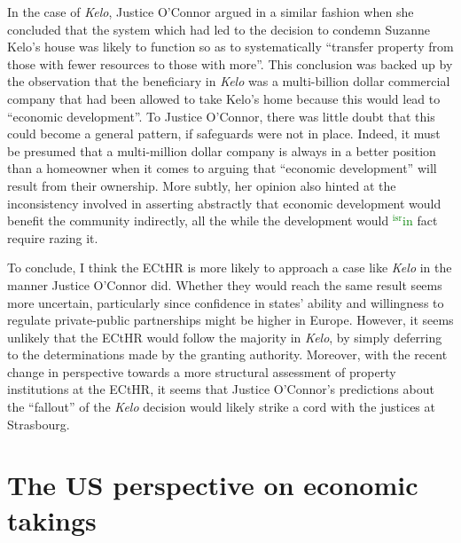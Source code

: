 \documentclass[12pt,a4paper]{book} %
\newcommand{\isr}[1]{\textcolor{green}{$^{\textrm{isr}}${#1}}}
\begin{document}
In the case of {\it Kelo}, Justice O'Connor argued in  a similar fashion when she concluded that the system which had led to the decision to condemn Suzanne Kelo's house was likely to function so as to systematically ``transfer property from those with fewer resources to those with more''. This conclusion was backed up by the observation that the beneficiary in {\it Kelo} was a multi-billion dollar commercial company that had been allowed to take Kelo's home because this would lead to ``economic development''. To Justice O'Connor, there was little doubt that this could become a general pattern, if safeguards were not in place. Indeed, it must be presumed that a multi-million dollar company is always in a better position than a homeowner when it comes to arguing that  ``economic development'' will result from their ownership. More subtly, her opinion also hinted at the inconsistency involved in asserting abstractly that economic development would benefit the community indirectly, all the while the development would \isr{in} fact require razing it.

To conclude, I think the ECtHR is more likely to approach a case like {\it Kelo} in the manner Justice O'Connor did. Whether they would reach the same result seems more uncertain, particularly since confidence in states' ability and willingness to regulate private-public partnerships might be higher in Europe. However, it seems unlikely that the ECtHR would follow the majority in {\it Kelo}, by simply deferring to the determinations made by the granting authority. Moreover, with the recent change in perspective towards a more structural assessment of property institutions at the ECtHR, it seems that Justice O'Connor's predictions about the ``fallout'' of the {\it Kelo} decision would likely strike a cord with the justices at Strasbourg. 

\section{The US perspective on economic takings}\label{sec:us}
\end{document}
